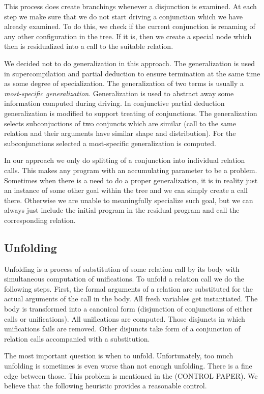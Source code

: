 This process does create branchings whenever a disjunction is examined.
At each step we make sure that we do not start driving a conjunction which we have already examined.
To do this, we check if the current conjunction is renaming of any other configuration in the tree.
If it is, then we create a special node which then is residualized into a call to the suitable relation.

We decided not to do generalization in this approach.
The generalization is used in supercompilation and partial deduction to ensure termination at the same time as some degree of specialization.
The generalization of two terms is usually a \emph{most-specific generalization}.
Generalization is used to abstract away some information computed during driving.
In conjunctive partial deduction generalization is modified to support treating of conjunctions.
The generalization selects subconjuctions of two conjuncts which are similar (call to the same relation and their arguments have similar shape and distribution).
For the subconjunctions selected a most-specific generalization is computed.

In our approach we only do splitting of a conjunction into individual relation calls.
This makes any program with an accumulating parameter to be a problem.
Sometimes when there is a need to do a proper generalization, it is in reality just an instance of some other goal within the tree and we can simply create a call there.
Otherwise we are unable to meaningfully specialize such goal, but we can always just include the initial program in the residual program and call the corresponding relation.


\subsection{Unfolding}

Unfolding is a process of substitution of some relation call by its body with simultaneous computation of unifications.
To unfold a relation call we do the following steps.
First, the formal arguments of a relation are substituted for the actual arguments of the call in the body.
All fresh variables get instantiated.
The body is transformed into a canonical form (disjunction of conjunctions of either calls or unifications).
All unifications are computed.
Those disjuncts in which unifications fails are removed.
Other disjuncts take form of a conjunction of relation calls accompanied with a substitution.

The most important question is when to unfold.
Unfortunately, too much unfolding is sometimes is even worse than not enough unfolding.
There is a fine edge between those.
This problem is mentioned in the (CONTROL PAPER).
We believe that the following heuristic provides a reasonable control.

